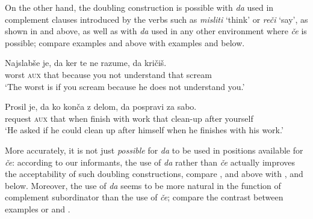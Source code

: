 \documentclass[output=paper,
]{langscibook}
\begin{document}
\begin{exe} 
\end{exe}

\noindent On the other hand, the doubling construction is possible with \textit{da} used in complement clauses introduced by the verbs such as \textit{misliti} `think' or \textit{reči} `say', as shown in  and  above, as well as with \textit{da} used in any other environment where \textit{če} is possible; compare examples  and  above with examples  and  below. 

\begin{exe} 
\ex \label{ex:plesnicar:nineteen}
\gll Najslabše	je, 	da 	ker 		te	ne 	razume, 	da 	kričiš.\\
 worst		\textsc{aux}	that	because	you	not	understand	that     scream \\
\trans `The worst is if you scream because he does not understand you.' 
\end{exe}

\begin{exe} 
\ex \label{ex:plesnicar:twenty}
\gll Prosil 		je, 	da 	ko 	konča	 z 	delom, da 	pospravi za 	sabo.\\	
request		\textsc{aux}	that	when	finish	with	work	that 	clean-up after	yourself \\
\trans `He asked if he could clean up after himself when he finishes with his work.' 
\end{exe}

\noindent More accurately, it is not just \textit{possible} for \textit{da} to be used in positions available for \textit{če}: according to our informants, the use of \textit{da} rather than \textit{če} actually improves the acceptability of such doubling constructions, compare ,  and  above with ,  and  below. Moreover, the use of \textit{da} seems to be more natural in the function of complement subordinator than the use of \textit{če}; compare the contrast between examples  or  and .
\end{document}
